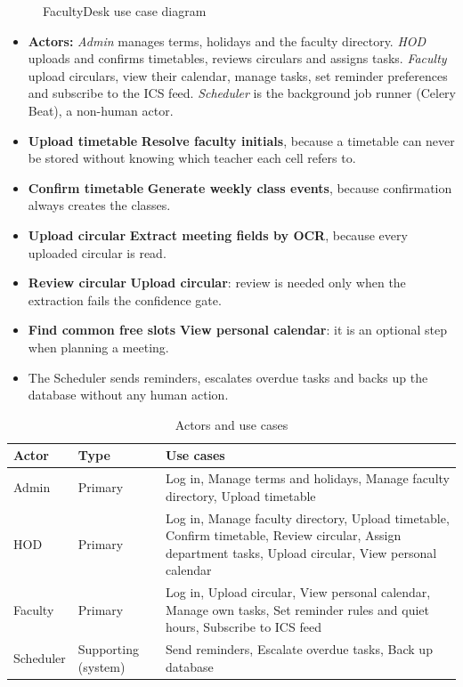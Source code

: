\begin{figure}[!htbp]
  \centering
  \resizebox{\textwidth}{!}{}
  \caption{FacultyDesk use case diagram}
  \label{fig:usecase}
\end{figure}

\begin{itemize}
  \item \textbf{Actors:} \emph{Admin} manages terms, holidays and the faculty directory. \emph{HOD} uploads and confirms timetables, reviews circulars and assigns tasks. \emph{Faculty} upload circulars, view their calendar, manage tasks, set reminder preferences and subscribe to the ICS feed. \emph{Scheduler} is the background job runner (Celery Beat), a non-human actor.
  \item \textbf{Upload timetable}  \textbf{Resolve faculty initials}, because a timetable can never be stored without knowing which teacher each cell refers to.
  \item \textbf{Confirm timetable}  \textbf{Generate weekly class events}, because confirmation always creates the classes.
  \item \textbf{Upload circular}  \textbf{Extract meeting fields by OCR}, because every uploaded circular is read.
  \item \textbf{Review circular}  \textbf{Upload circular}: review is needed only when the extraction fails the confidence gate.
  \item \textbf{Find common free slots}  \textbf{View personal calendar}: it is an optional step when planning a meeting.
  \item The Scheduler sends reminders, escalates overdue tasks and backs up the database without any human action.
\end{itemize}

\begin{xltabular}{\textwidth}{|p{2.4cm}|p{2.6cm}|Y|}
\caption{Actors and use cases}\\
\hline
\textbf{Actor} & \textbf{Type} & \textbf{Use cases} \\ \hline
Admin & Primary & Log in, Manage terms and holidays, Manage faculty directory, Upload timetable \\ \hline
HOD & Primary & Log in, Manage faculty directory, Upload timetable, Confirm timetable, Review circular, Assign department tasks, Upload circular, View personal calendar \\ \hline
Faculty & Primary & Log in, Upload circular, View personal calendar, Manage own tasks, Set reminder rules and quiet hours, Subscribe to ICS feed \\ \hline
Scheduler & Supporting (system) & Send reminders, Escalate overdue tasks, Back up database \\ \hline
\end{xltabular}

